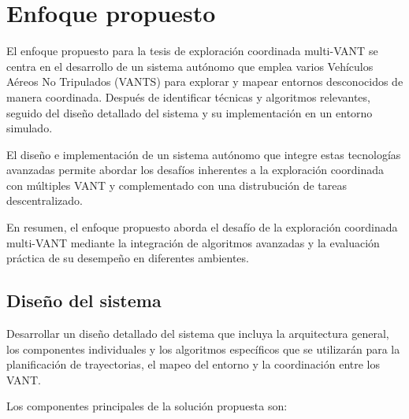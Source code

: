 \chapter{Enfoque propuesto}

El enfoque propuesto para la tesis de exploración coordinada multi-VANT se centra en el desarrollo de un sistema autónomo que emplea varios Vehículos Aéreos No Tripulados (VANTS) para explorar y mapear entornos desconocidos de manera coordinada. Después de identificar técnicas y algoritmos relevantes, seguido del diseño detallado del sistema y su implementación en un entorno simulado.

El diseño e implementación de un sistema autónomo que integre estas tecnologías avanzadas permite abordar los desafíos inherentes a la exploración coordinada con múltiples VANT y complementado con una distrubución de tareas descentralizado.

En resumen, el enfoque propuesto aborda el desafío de la exploración coordinada multi-VANT mediante la integración de algoritmos avanzadas y la evaluación práctica de su desempeño en diferentes ambientes.






\section{Diseño del sistema}

Desarrollar un diseño detallado del sistema que incluya la arquitectura general, los componentes individuales y los algoritmos específicos que se utilizarán para la planificación de trayectorias, el mapeo del entorno y la coordinación entre los VANT.

Los componentes principales de la solución propuesta son:

